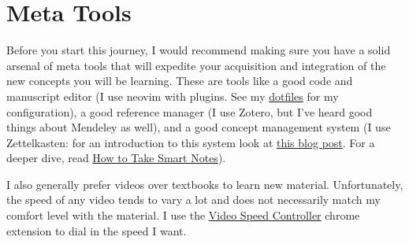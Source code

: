 \hypertarget{meta-tools}{%
\section{Meta Tools}\label{meta-tools}}

Before you start this journey, I would recommend making sure you have a
solid arsenal of meta tools that will expedite your acquisition and
integration of the new concepts you will be learning. These are tools
like a good code and manuscript editor (I use neovim with plugins. See
my \href{https://github.com/yashsavani/dotfiles}{dotfiles} for my
configuration), a good reference manager (I use Zotero, but I've heard
good things about Mendeley as well), and a good concept management
system (I use Zettelkasten: for an introduction to this system look at
\href{https://zenkit.com/en/blog/a-beginners-guide-to-the-zettelkasten-method/}{this
blog post}. For a deeper dive, read
\href{https://www.amazon.com/How-Take-Smart-Notes-Nonfiction/dp/1542866502}{How
to Take Smart Notes}).

I also generally prefer videos over textbooks to learn new material.
Unfortunately, the speed of any video tends to vary a lot and does not
necessarily match my comfort level with the material. I use the
\href{https://chrome.google.com/webstore/detail/video-speed-controller/nffaoalbilbmmfgbnbgppjihopabppdk}{Video
Speed Controller} chrome extension to dial in the speed I want.
